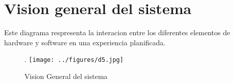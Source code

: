 \section{Vision general del sistema}

Este diagrama respresenta la interacion entre los diferentes elementos de hardware y software en una experiencia planificada.

\begin{figure}[!htb].
    \texttt{[image: ../figures/d5.jpg]}
    \caption{Vision General del sistema}
    \label{fig:d5}
\end{figure}

\newpage